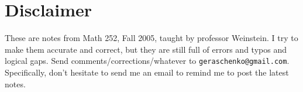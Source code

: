 \section*{Disclaimer}
 These are notes from Math 252, Fall 2005, taught by professor Weinstein.  I
 try to make them accurate and correct, but they are still full of errors and
 typos and logical gaps. Send comments/corrections/whatever to
 \texttt{geraschenko@gmail.com}.  Specifically, don't hesitate to send me an
 email to remind me to post the latest notes.
